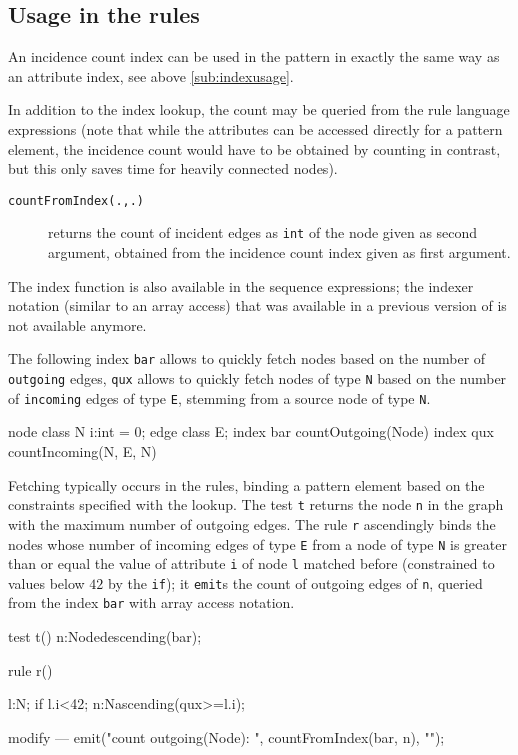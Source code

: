 \subsection*{Usage in the rules}
An incidence count index can be used in the pattern in exactly the same way as an attribute index, see above \ref{sub:indexusage}.

In addition to the index lookup, the count may be queried from the rule language expressions (note that while the attributes can be accessed directly for a pattern element, the incidence count would have to be obtained by counting in contrast, but this only saves time for heavily connected nodes).

\begin{description}
\item[\texttt{countFromIndex(.,.)}] returns the count of incident edges as \texttt{int} of the node given as second argument, obtained from the incidence count index given as first argument.
\end{description}

The index function is also available in the sequence expressions; the indexer notation (similar to an array access) that was available in a previous version of \GrG{} is not available anymore.


\begin{example}
The following index \texttt{bar} allows to quickly fetch nodes based on the number of \texttt{outgoing} edges, \texttt{qux} allows to quickly fetch nodes of type \texttt{N} based on the number of \texttt{incoming} edges of type \texttt{E}, stemming from a source node of type \texttt{N}.

\begin{grgen}
node class N {
	i:int = 0;
}
edge class E;
index bar { countOutgoing(Node) }
index qux { countIncoming(N, E, N) }
\end{grgen}

Fetching typically occurs in the rules, binding a pattern element based on the constraints specified with the lookup.
The test \texttt{t} returns the node \texttt{n} in the graph with the maximum number of outgoing edges.
The rule \texttt{r} ascendingly binds the nodes whose number of incoming edges of type \texttt{E} from a node of type \texttt{N} is greater than or equal the value of attribute \texttt{i} of node \texttt{l} matched before (constrained to values below $42$ by the \texttt{if}); it \texttt{emit}s the count of outgoing edges of \texttt{n}, queried from the index \texttt{bar} with array access notation.

\begin{grgen}
test t() {
	n:Node{descending(bar)};
}

rule r() {
  l:N; if{ l.i<42;}
  n:N{ascending(qux>=l.i)};
	
  modify {
  ---
    emit("count outgoing(Node): ", countFromIndex(bar, n), "\n");
  }
}
\end{grgen}

\end{example}


